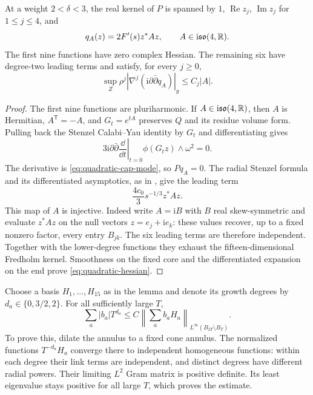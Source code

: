 \begin{lemma}\label{lem:cap-harmonic-basis}
At a weight $2<\delta<3$, the real kernel of $P$ is spanned by
$1$, $\operatorname{Re}z_j$, $\operatorname{Im}z_j$ for $1\le j\le4$,
and
\begin{equation}\label{eq:quadratic-cap-mode}
 q_A(z)=2F'(s)z^*Az,\qquad A\in\mathrm i\mathfrak{so}(4,\mathbb R).
\end{equation}
The first nine functions have zero complex Hessian. The remaining six
have degree-two leading terms and satisfy, for every $j\ge0$,
\begin{equation}\label{eq:quadratic-hessian}
 \sup_Z\rho^j
   |\nabla^j(\mathrm i\partial\bar\partial q_A)|_g\le C_j|A|.
\end{equation}
\end{lemma}
\begin{proof}
The first nine functions are pluriharmonic. If
$A\in\mathrm i\mathfrak{so}(4,\mathbb R)$, then $A$ is Hermitian,
$A^{\mathsf T}=-A$, and $G_t=e^{tA}$ preserves $Q$ and its
residue volume form. Pulling back the Stenzel Calabi--Yau identity
by $G_t$ and differentiating gives
\[
 3\mathrm i\partial\bar\partial
       \left.\frac{\dd}{\dd t}\right|_{t=0}\phi(G_tz)
       \wedge\omega^2=0.
\]
The derivative is \eqref{eq:quadratic-cap-mode}, so $Pq_A=0$.
The radial Stenzel formula and its differentiated asymptotics, as in
\cite[Lemma~5.14]{conlon-hein}, give the leading term
\[
 \frac{4c_0}{3}s^{-1/3}z^*Az.
\]
This map of $A$ is injective. Indeed write $A=\mathrm i B$ with
$B$ real skew-symmetric and evaluate $z^*Az$ on the null vectors
$z=e_j+\mathrm i e_k$: these values recover, up to a fixed
nonzero factor, every entry $B_{jk}$. The six leading terms are
therefore independent. Together with the lower-degree functions
they exhaust the fifteen-dimensional Fredholm kernel. Smoothness
on the fixed core and the differentiated expansion on the end prove
\eqref{eq:quadratic-hessian}.
\end{proof}

Choose a basis $H_1,\ldots,H_{15}$ as in the lemma and denote its
growth degrees by $d_a\in\{0,3/2,2\}$. For all sufficiently large $T$,
\begin{equation}\label{eq:annular-harmonic-coefficients}
 \sum_a|b_a|T^{d_a}
   \le C\left\|\sum_ab_aH_a\right\|_{L^\infty(B_{2T}\setminus B_T)}.
\end{equation}
To prove this, dilate the annulus to a fixed cone annulus. The
normalized functions $T^{-d_a}H_a$ converge there to independent
homogeneous functions: within each degree their link terms are
independent, and distinct degrees have different radial powers.
Their limiting $L^2$ Gram matrix is positive definite. Its least
eigenvalue stays positive for all large $T$, which proves the estimate.

